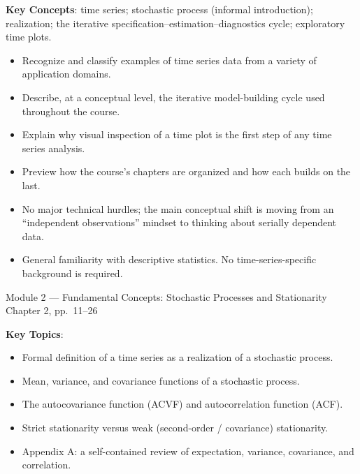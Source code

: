 \documentclass[11pt]{article}
\newcommand{\keytopics}{\textbf{\color{modblue}Key Topics}}
\newcommand{\keyconcepts}{\textbf{\color{modblue}Key Concepts}}
\begin{document}
\keyconcepts: time series; stochastic process (informal introduction); realization; the iterative specification--estimation--diagnostics cycle; exploratory time plots.

\begin{objectives}
\begin{itemize}
  \item Recognize and classify examples of time series data from a variety of application domains.
  \item Describe, at a conceptual level, the iterative model-building cycle used throughout the course.
  \item Explain why visual inspection of a time plot is the first step of any time series analysis.
  \item Preview how the course's chapters are organized and how each builds on the last.
\end{itemize}
\end{objectives}

\begin{difficult}
\begin{itemize}
  \item No major technical hurdles; the main conceptual shift is moving from an ``independent observations'' mindset to thinking about serially dependent data.
\end{itemize}
\end{difficult}

\begin{prereqs}
\begin{itemize}
  \item General familiarity with descriptive statistics. No time-series-specific background is required.
\end{itemize}
\end{prereqs}

\vspace{6pt}
\begin{moduletitle}{Module 2 --- Fundamental Concepts: Stochastic Processes and Stationarity}
\small Chapter 2, pp.\ 11--26
\end{moduletitle}

\keytopics:
\begin{itemize}
  \item Formal definition of a time series as a realization of a stochastic process.
  \item Mean, variance, and covariance functions of a stochastic process.
  \item The autocovariance function (ACVF) and autocorrelation function (ACF).
  \item Strict stationarity versus weak (second-order / covariance) stationarity.
  \item Appendix A: a self-contained review of expectation, variance, covariance, and correlation.
\end{itemize}
\end{document}
